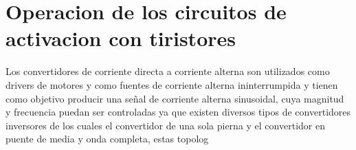 ﻿\documentclass[10pt,a4paper]{article}
\begin{document}
\maketitle\section{Operacion de los circuitos de activacion con tiristores}
Los  convertidores  de  corriente  directa  a  corriente  alterna  son  utilizados  como  drivers  de  motores  y  como  fuentes  de  corriente  alterna  ininterrumpida  y  tienen  como  objetivo  producir  una  señal  de  corriente  alterna  sinusoidal,  cuya  magnitud  y  frecuencia  puedan  ser  controladas ya que existen  diversos  tipos  de  convertidores  inversores  de  los  cuales  el  convertidor  de  una  sola  pierna  y  el  convertidor  en  puente  de  media  y  onda  completa, estas  topolog
\end{document}
